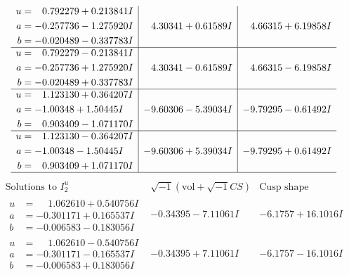 \documentclass[1p]{elsarticle_modified}
\theoremstyle{definition}
\newcommand{\I}{\sqrt{-1}}
\begin{document}
$$\begin{array}{c|c|c}
\begin{aligned}
u &= \phantom{-}0.792279 + 0.213841 I \\
a &= -0.257736 - 1.275920 I \\
b &= -0.020489 - 0.337783 I\end{aligned}
 & \phantom{-}4.30341 + 0.61589 I & \phantom{-}4.66315 + 6.19858 I \\ \hline\begin{aligned}
u &= \phantom{-}0.792279 - 0.213841 I \\
a &= -0.257736 + 1.275920 I \\
b &= -0.020489 + 0.337783 I\end{aligned}
 & \phantom{-}4.30341 - 0.61589 I & \phantom{-}4.66315 - 6.19858 I \\ \hline\begin{aligned}
u &= \phantom{-}1.123130 + 0.364207 I \\
a &= -1.00348 + 1.50445 I \\
b &= \phantom{-}0.903409 - 1.071170 I\end{aligned}
 & -9.60306 - 5.39034 I & -9.79295 - 0.61492 I \\ \hline\begin{aligned}
u &= \phantom{-}1.123130 - 0.364207 I \\
a &= -1.00348 - 1.50445 I \\
b &= \phantom{-}0.903409 + 1.071170 I\end{aligned}
 & -9.60306 + 5.39034 I & -9.79295 + 0.61492 I\\
 \hline 
 \end{array}$$\newpage$$\begin{array}{c|c|c}  
\text{Solutions to }I^u_{2}& \I (\text{vol} + \sqrt{-1}CS) & \text{Cusp shape}\\
 \hline 
\begin{aligned}
u &= \phantom{-}1.062610 + 0.540756 I \\
a &= -0.301171 + 0.165537 I \\
b &= -0.006583 - 0.183056 I\end{aligned}
 & -0.34395 - 7.11061 I & -6.1757 + 16.1016 I \\ \hline\begin{aligned}
u &= \phantom{-}1.062610 - 0.540756 I \\
a &= -0.301171 - 0.165537 I \\
b &= -0.006583 + 0.183056 I\end{aligned}
 & -0.34395 + 7.11061 I & -6.1757 - 16.1016 I \\ \hline\begin{aligned}

\end{aligned}
\end{array}$$
\end{document}
